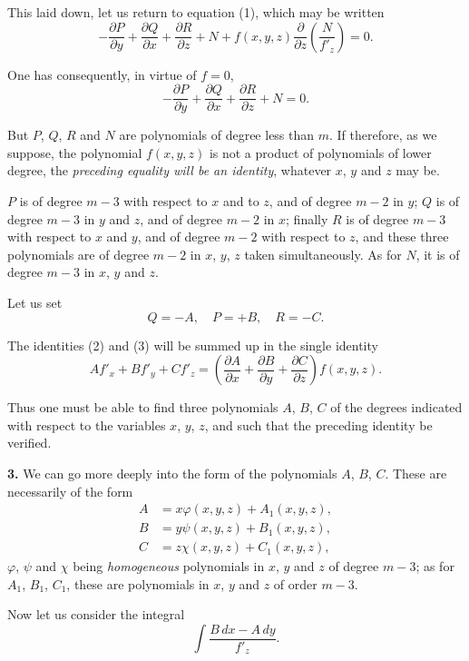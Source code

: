 \documentclass{article}
\begin{document}

This laid down, let us return to equation (1), which may be written
\[
-\frac{\partial P}{\partial y} + \frac{\partial Q}{\partial x} + \frac{\partial R}{\partial z} + N + f(x, y, z)\frac{\partial}{\partial z}\left(\frac{N}{f'_{z}}\right) = 0.
\]

One has consequently, in virtue of $f = 0$,
\[
-\frac{\partial P}{\partial y} + \frac{\partial Q}{\partial x} + \frac{\partial R}{\partial z} + N = 0. \tag{3}
\]

But $P$, $Q$, $R$ and $N$ are polynomials of degree less than $m$. If therefore, as we suppose, the polynomial $f(x, y, z)$ is not a product of polynomials of lower degree, the \emph{preceding equality will be an identity}, whatever $x$, $y$ and $z$ may be.

$P$ is of degree $m - 3$ with respect to $x$ and to $z$, and of degree $m - 2$ in $y$; $Q$ is of degree $m - 3$ in $y$ and $z$, and of degree $m - 2$ in $x$; finally $R$ is of degree $m - 3$ with respect to $x$ and $y$, and of degree $m - 2$ with respect to $z$, and these three polynomials are of degree $m - 2$ in $x$, $y$, $z$ taken simultaneously. As for $N$, it is of degree $m - 3$ in $x$, $y$ and $z$.

Let us set
\[
Q = -A, \quad P = +B, \quad R = -C.
\]

The identities (2) and (3) will be summed up in the single identity
\[
Af'_{x} + Bf'_{y} + Cf'_{z} = \left(\frac{\partial A}{\partial x} + \frac{\partial B}{\partial y} + \frac{\partial C}{\partial z}\right)f(x, y, z).
\]

Thus one must be able to find three polynomials $A$, $B$, $C$ of the degrees indicated with respect to the variables $x$, $y$, $z$, and such that the preceding identity be verified.

\textbf{3.} We can go more deeply into the form of the polynomials $A$, $B$, $C$. These are necessarily of the form
\[
\begin{aligned}
A &= x\varphi(x, y, z) + A_{1}(x, y, z), \\
B &= y\psi(x, y, z) + B_{1}(x, y, z), \\
C &= z\chi(x, y, z) + C_{1}(x, y, z),
\end{aligned}
\]
$\varphi$, $\psi$ and $\chi$ being \emph{homogeneous} polynomials in $x$, $y$ and $z$ of degree $m - 3$; as for $A_{1}$, $B_{1}$, $C_{1}$, these are polynomials in $x$, $y$ and $z$ of order $m - 3$.

Now let us consider the integral
\[
\int \frac{B\,dx - A\,dy}{f'_{z}}.
\]
\end{document}
